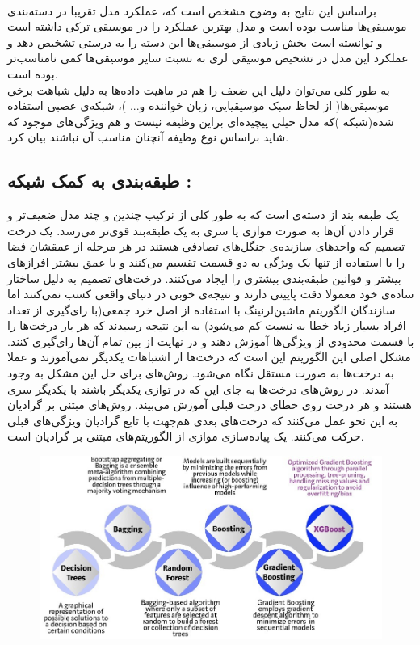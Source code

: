 \documentclass[10pt,onecolumn,a4paper]{article}
\begin{document}
\\
براساس این نتایج به وضوح مشخص است که، عملکرد مدل تقریبا در دسته‌بندی موسیقی‌ها مناسب بوده است و مدل بهترین عملکرد را در موسیقی ترکی داشته است و توانسته است بخش زیادی از موسیقی‌ها این دسته‌ را به درستی تشخیص دهد و عملکرد این مدل در تشخیص موسیقی لری به نسبت سایر موسیقی‌ها کمی نامناسب‌تر بوده است.\\ 
به طور کلی می‌توان دلیل این ضعف را هم در ماهیت داده‌ها به دلیل شباهت برخی موسیقی‌ها( از لحاظ سبک موسیقیایی، زبان خواننده و... )، شبکه‌ی عصبی استفاده شده(شبکه  )که مدل خیلی پیچیده‌ای براین وظیفه نیست و هم ویژگی‌های موجود که شاید براساس نوع وظیفه آنچنان مناسب آن نباشند بیان کرد.\\ 


\subsection{طبقه‌بندی به کمک شبکه :}

 یک طبقه بند از دسته‌ی   است که به طور کلی از نرکیب چندین و چند مدل ضعیف‌تر و قرار دادن آن‌ها به صورت موازی یا سری به یک طبقه‌بند قوی‌تر می‌رسد. یک درخت تصمیم که واحدهای سازنده‌ی جنگل‌های تصادفی هستند در هر مرحله از عمقشان فضا را با استفاده از تنها یک ویژگی به دو قسمت تقسیم می‌کنند و با عمق بیشتر افرازهای بیشتر و قوانین طبقه‌بندی بیشتری را ایجاد می‌کنند. درخت‌های تصمیم به دلیل ساختار ساده‌ی خود معمولا دقت پایینی دارند و نتیجه‌ی خوبی در دنیای واقعی کسب نمی‌کنند اما سازندگان الگوریتم ماشین‌لرنینگ با استفاده از اصل خرد جمعی(با رای‌گیری از تعداد افراد بسیار زیاد خطا به نسبت کم می‌شود) به این نتیجه رسیدند که هر بار درخت‌ها را با قسمت محدودی از ویژگی‌ها آموزش دهند و در نهایت از بین تمام آن‌ها رای‌گیری کنند. مشکل اصلی این الگوریتم این است که درخت‌ها از اشتباهات یکدیگر نمی‌آموزند و عملا به درخت‌ها به صورت مستقل نگاه می‌شود. روش‌های  برای حل این مشکل به وجود آمدند.  در روش‌های  درخت‌ها به جای این که در توازی یکدیگر باشند با یکدیگر سری هستند و هر درخت روی خطای درخت قبلی آموزش می‌بیند. روش‌های مبتنی بر گرادیان به این نحو عمل می‌کنند که درخت‌های بعدی هم‌جهت با تابع گرادیان ویژگی‌های قبلی حرکت می‌کنند.  یک پیاده‌سازی موازی از الگوریتم‌های مبتنی بر گرادیان است.

\begin{figure}[h!]
        \centering
        \includegraphics[scale=0.5]{f.jpg}
        \caption{  }  
    \end{figure}
\end{document}
